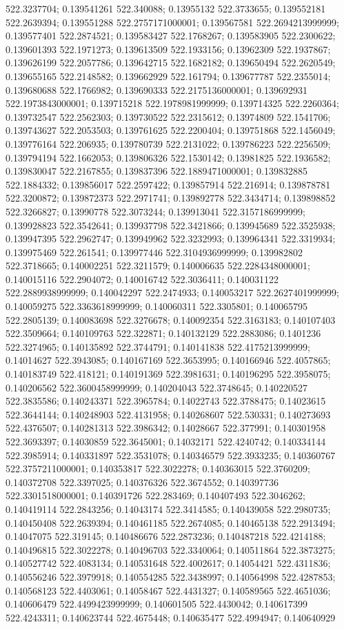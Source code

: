 522.3237704; 0.139541261 522.340088; 0.13955132 522.3733655; 0.139552181 522.2639394; 0.139551288 522.2757171000001; 0.139567581 522.2694213999999; 0.139577401 522.2874521; 0.139583427 522.1768267; 0.139583905 522.2300622; 0.139601393 522.1971273; 0.139613509 522.1933156; 0.13962309 522.1937867; 0.139626199 522.2057786; 0.139642715 522.1682182; 0.139650494 522.2620549; 0.139655165 522.2148582; 0.139662929 522.161794; 0.139677787 522.2355014; 0.139680688 522.1766982; 0.139690333 522.2175136000001; 0.139692931 522.1973843000001; 0.139715218 522.1978981999999; 0.139714325 522.2260364; 0.139732547 522.2562303; 0.139730522 522.2315612; 0.13974809 522.1541706; 0.139743627 522.2053503; 0.139761625 522.2200404; 0.139751868 522.1456049; 0.139776164 522.206935; 0.139780739 522.2131022; 0.139786223 522.2256509; 0.139794194 522.1662053; 0.139806326 522.1530142; 0.13981825 522.1936582; 0.139830047 522.2167855; 0.139837396 522.1889471000001; 0.139832885 522.1884332; 0.139856017 522.2597422; 0.139857914 522.216914; 0.139878781 522.3200872; 0.139872373 522.2971741; 0.139892778 522.3434714; 0.139898852 522.3266827; 0.13990778 522.3073244; 0.139913041 522.3157186999999; 0.139928823 522.3542641; 0.139937798 522.3421866; 0.139945689 522.3525938; 0.139947395 522.2962747; 0.139949962 522.3232993; 0.139964341 522.3319934; 0.139975469 522.261541; 0.139977446 522.3104936999999; 0.139982802 522.3718665; 0.140002251 522.3211579; 0.140006635 522.2284348000001; 0.140015116 522.2904072; 0.140016742 522.3036411; 0.140031122 522.2889938999999; 0.140042297 522.2474933; 0.140053217 522.2627401999999; 0.140059275 522.3363618999999; 0.140060311 522.3305801; 0.140065795 522.2805139; 0.140083698 522.3276678; 0.140092354 522.3163183; 0.140107403 522.3509664; 0.140109763 522.322871; 0.140132129 522.2883086; 0.1401236 522.3274965; 0.140135892 522.3744791; 0.140141838 522.4175213999999; 0.14014627 522.3943085; 0.140167169 522.3653995; 0.140166946 522.4057865; 0.140183749 522.418121; 0.140191369 522.3981631; 0.140196295 522.3958075; 0.140206562 522.3600458999999; 0.140204043 522.3748645; 0.140220527 522.3835586; 0.140243371 522.3965784; 0.14022743 522.3788475; 0.14023615 522.3644144; 0.140248903 522.4131958; 0.140268607 522.530331; 0.140273693 522.4376507; 0.140281313 522.3986342; 0.14028667 522.377991; 0.140301958 522.3693397; 0.14030859 522.3645001; 0.14032171 522.4240742; 0.140334144 522.3985914; 0.140331897 522.3531078; 0.140346579 522.3933235; 0.140360767 522.3757211000001; 0.140353817 522.3022278; 0.140363015 522.3760209; 0.140372708 522.3397025; 0.140376326 522.3674552; 0.140397736 522.3301518000001; 0.140391726 522.283469; 0.140407493 522.3046262; 0.140419114 522.2843256; 0.14043174 522.3414585; 0.140439058 522.2980735; 0.140450408 522.2639394; 0.140461185 522.2674085; 0.140465138 522.2913494; 0.14047075 522.319145; 0.140486676 522.2873236; 0.140487218 522.4214188; 0.140496815 522.3022278; 0.140496703 522.3340064; 0.140511864 522.3873275; 0.140527742 522.4083134; 0.140531648 522.4002617; 0.14054421 522.4311836; 0.140556246 522.3979918; 0.140554285 522.3438997; 0.140564998 522.4287853; 0.140568123 522.4403061; 0.14058467 522.4431327; 0.140589565 522.4651036; 0.140606479 522.4499423999999; 0.140601505 522.4430042; 0.140617399 522.4243311; 0.140623744 522.4675448; 0.140635477 522.4994947; 0.140640929 
